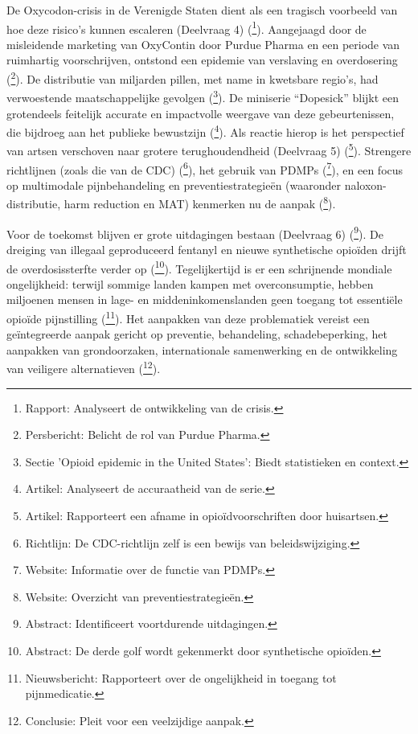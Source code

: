 \documentclass[11pt, a4paper]{report} %
\begin{document}
De Oxycodon-crisis in de Verenigde Staten dient als een tragisch voorbeeld van hoe deze risico's kunnen escaleren (Deelvraag 4) (\cite{CRS2022OpioidCrisisHistory}\footnote{Rapport: Analyseert de ontwikkeling van de crisis.}). Aangejaagd door de misleidende marketing van OxyContin door Purdue Pharma en een periode van ruimhartig voorschrijven, ontstond een epidemie van verslaving en overdosering (\cite{JusticeDeptPurdueResolution}\footnote{Persbericht: Belicht de rol van Purdue Pharma.}). De distributie van miljarden pillen, met name in kwetsbare regio's, had verwoestende maatschappelijke gevolgen (\cite{WikipediaOpioidEpidemicUS}\footnote{Sectie 'Opioid epidemic in the United States': Biedt statistieken en context.}). De miniserie \enquote{Dopesick} blijkt een grotendeels feitelijk accurate en impactvolle weergave van deze gebeurtenissen, die bijdroeg aan het publieke bewustzijn (\cite{AvenuesRecoveryDopesickTrue}\footnote{Artikel: Analyseert de accuraatheid van de serie.}). Als reactie hierop is het perspectief van artsen verschoven naar grotere terughoudendheid (Deelvraag 5) (\cite{GrahamCenter2024OpioidDecrease}\footnote{Artikel: Rapporteert een afname in opioïdvoorschriften door huisartsen.}). Strengere richtlijnen (zoals die van de CDC) (\cite{Dowell2016CDCGuideline}\footnote{Richtlijn: De CDC-richtlijn zelf is een bewijs van beleidswijziging.}), het gebruik van PDMPs (\cite{CDCPDMPs}\footnote{Website: Informatie over de functie van PDMPs.}), en een focus op multimodale pijnbehandeling en preventiestrategieën (waaronder naloxon-distributie, harm reduction en MAT) kenmerken nu de aanpak (\cite{CDCPreventingOverdose}\footnote{Website: Overzicht van preventiestrategieën.}).

Voor de toekomst blijven er grote uitdagingen bestaan (Deelvraag 6) (\cite{Schuler2020StateScienceOpioidPolicy}\footnote{Abstract: Identificeert voortdurende uitdagingen.}). De dreiging van illegaal geproduceerd fentanyl en nieuwe synthetische opioïden drijft de overdosissterfte verder op (\cite{Ciccarone2019TripleWave}\footnote{Abstract: De derde golf wordt gekenmerkt door synthetische opioïden.}). Tegelijkertijd is er een schrijnende mondiale ongelijkheid: terwijl sommige landen kampen met overconsumptie, hebben miljoenen mensen in lage- en middeninkomenslanden geen toegang tot essentiële opioïde pijnstilling (\cite{INCB2024Report}\footnote{Nieuwsbericht: Rapporteert over de ongelijkheid in toegang tot pijnmedicatie.}). Het aanpakken van deze problematiek vereist een geïntegreerde aanpak gericht op preventie, behandeling, schadebeperking, het aanpakken van grondoorzaken, internationale samenwerking en de ontwikkeling van veiligere alternatieven (\cite{Volkow2021ChangingOpioidCrisis}\footnote{Conclusie: Pleit voor een veelzijdige aanpak.}).
\end{document}
